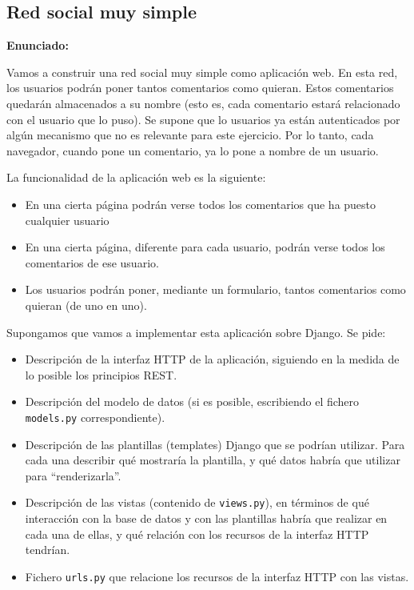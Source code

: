 \subsection{Red social muy simple}
\label{subsec:mvc-red-social}

\textbf{Enunciado:}

Vamos a construir una red social muy simple como aplicación web. En esta red, los usuarios podrán poner tantos comentarios como quieran. Estos comentarios quedarán almacenados a su nombre (esto es, cada comentario estará relacionado con el usuario que lo puso). Se supone que lo usuarios ya están autenticados por algún mecanismo que no es relevante para este ejercicio. Por lo tanto, cada navegador, cuando pone un comentario, ya lo pone a nombre de un usuario.

La funcionalidad de la aplicación web es la siguiente:

\begin{itemize}
\item En una cierta página podrán verse todos los comentarios que ha puesto cualquier usuario
\item En una cierta página, diferente para cada usuario, podrán verse todos los comentarios de ese usuario.
\item Los usuarios podrán poner, mediante un formulario, tantos comentarios como quieran (de uno en uno).
\end{itemize}

Supongamos que vamos a implementar esta aplicación sobre Django. Se pide:

\begin{itemize}
\item Descripción de la interfaz HTTP de la aplicación, siguiendo en la medida de lo posible los principios REST.
\item Descripción del modelo de datos (si es posible, escribiendo el fichero \texttt{models.py} correspondiente).
\item Descripción de las plantillas (templates) Django que se podrían utilizar. Para cada una describir qué mostraría la plantilla, y qué datos habría que utilizar para ``renderizarla''.
\item Descripción de las vistas (contenido de \texttt{views.py}), en términos de qué interacción con la base de datos y con las plantillas habría que realizar en cada una de ellas, y qué relación con los recursos de la interfaz HTTP tendrían.
\item Fichero \texttt{urls.py} que relacione los recursos de la interfaz HTTP con las vistas.
\end{itemize}

